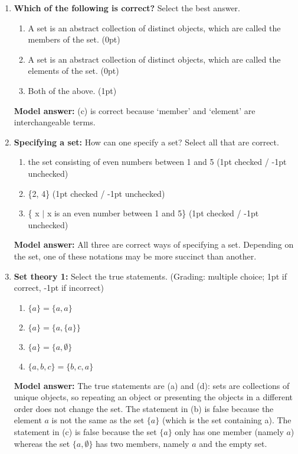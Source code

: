 \documentclass[a4,11pt]{article}
\begin{document}
\begin{enumerate}[leftmargin = 12pt]

\item {\bf Which of the following is correct?} Select the best answer.

      \begin{enumerate}[noitemsep]
        \item A set is an abstract collection of distinct objects, which are called the members of the set. (0pt)
	\item A set is an abstract collection of distinct objects, which are called the elements of the set. (0pt)
        \item Both of the above. (1pt)
	\end{enumerate}
	
{\bf Model answer:} (c) is correct because `member' and `element' are interchangeable terms.

\item {\bf Specifying a set:} How can one specify a set? Select all that are correct.

      \begin{enumerate}[noitemsep]
        \item the set consisting of even numbers between 1 and 5 (1pt checked / -1pt unchecked)
	\item \{2, 4\} (1pt checked / -1pt unchecked)
        \item \{ x $|$ x is an even number between 1 and 5\} (1pt checked / -1pt unchecked)
	\end{enumerate}	

{\bf Model answer:} All three are correct ways of specifying a set. Depending on the set, one of these notations may be more succinct than another.

\item {\bf Set theory 1:} Select the true statements. (Grading: multiple choice; 1pt if correct, -1pt if incorrect)

      \begin{enumerate}[noitemsep]
        \item $\{a\} = \{a, a\}$
        \item $\{a\} = \{a, \{a\}\}$
         \item $\{a\} = \{a, \emptyset\}$
         \item $\{a, b, c\} = \{b, c, a\}$
       \end{enumerate}

 {\bf Model answer:} The true statements are (a) and (d): sets are collections of unique objects, so repeating an object or presenting the objects in a different order does not change the set. The statement in (b) is false because the element $a$ is not the same as the set $\{a\}$ (which is the set containing a). The statement in (c) is false because the set $\{a\}$ only has one member (namely $a$) whereas the set $\{a, \emptyset\}$ has two members, namely $a$ and the empty set.
         

\end{enumerate}
\end{document}
